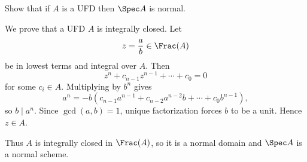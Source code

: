 \begin{problem}\label{prob:vi28-12}
Show that if \(A\) is a UFD then \(\Spec A\) is normal.

\end{problem}

\ifdefined\FullProblemDossiers
\begin{solution}
We prove that a UFD \(A\) is integrally closed. Let
\[
z=\frac ab\in\Frac(A)
\]
be in lowest terms and integral over \(A\). Then
\[
z^n+c_{n-1}z^{n-1}+\cdots+c_0=0
\]
for some \(c_i\in A\). Multiplying by \(b^n\) gives
\[
a^n=-b(c_{n-1}a^{n-1}+c_{n-2}a^{n-2}b+\cdots+c_0b^{n-1}),
\]
so \(b\mid a^n\). Since \(\gcd(a,b)=1\), unique factorization forces \(b\) to be a unit. Hence \(z\in A\).

Thus \(A\) is integrally closed in \(\Frac(A)\), so it is a normal domain and \(\Spec A\) is a normal scheme.
\end{solution}
\fi
